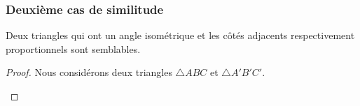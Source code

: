 \documentclass[a4paper,12pt]{article}
\begin{document}
\pagebreak
\subsubsection{Deuxième cas de similitude}
\begin{theorem}
Deux triangles qui ont un angle isométrique et les côtés adjacents respectivement proportionnels sont semblables.
\end{theorem}



\begin{proof}
Nous considérons deux triangles $\triangle ABC$ et $\triangle A'B'C'$.

\begin{hyp}
\end{hyp}

\begin{concl}
\end{concl}




\end{proof}
\end{document}
